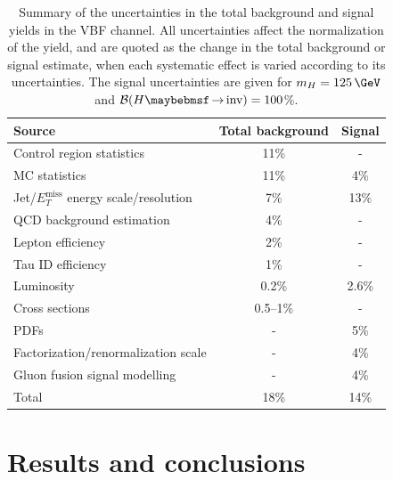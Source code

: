 \begin{table}[!htb]
\centering
\begin{tabular}{|l|c|c|}
\hline
Source                                           & Total background & Signal \\
\hline\hline
Control region statistics                        & 11\%             & -      \\
MC statistics                                    & 11\%             & 4\%    \\
Jet/$E_T^{\text{miss}}$ energy scale/resolution  & 7\%              & 13\%   \\
QCD background estimation                        & 4\%              & -      \\
Lepton efficiency                                & 2\%              & -      \\
Tau ID efficiency                                & 1\%              & -      \\
Luminosity                                       & 0.2\%            & 2.6\%  \\
Cross sections                                   & 0.5--1\%         & -      \\
PDFs                                             & -                & 5\%    \\
Factorization/renormalization scale              & -                & 4\%    \\
Gluon fusion signal modelling                    & -                & 4\%    \\
\hline\hline
Total                                            & 18\%             & 14\%   \\
\hline 
\end{tabular}
\caption{Summary of the uncertainties in the total background and signal yields in the \gls{VBF} channel. All uncertainties affect the normalization of the yield, and are quoted as the change in the total background or signal estimate, when each systematic effect is varied according to its uncertainties. The signal uncertainties are given for $m_H=125\,\GeV$ and $\BRinv=100$\%. \cite{ARTICLE:CMSVBFHiggsToInvAndZHCombination}}
\label{TABLE:PromptDataAnalysis_SourcesUncertaintySummary}
\end{table}


\section{Results and conclusions}

